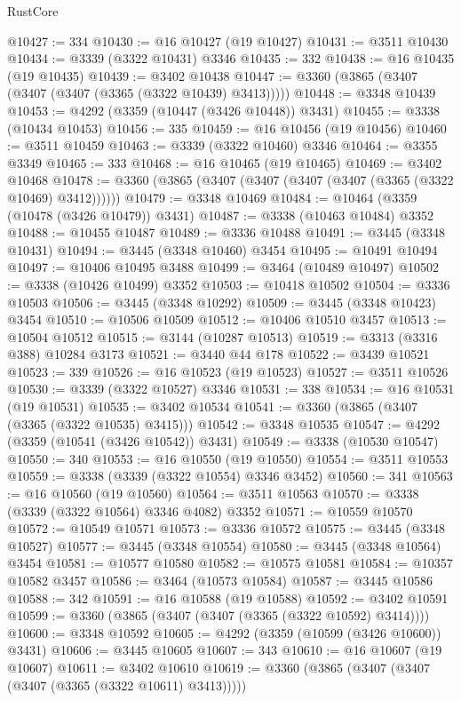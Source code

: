 \begin{lexlean}{RustCore}
\begin{coremodule}
@10427 := 334
@10430 := @16 @10427 (@19 @10427)
@10431 := @3511 @10430
@10434 := @3339 (@3322 @10431) @3346
@10435 := 332
@10438 := @16 @10435 (@19 @10435)
@10439 := @3402 @10438
@10447 := @3360 (@3865 (@3407 (@3407 (@3407 (@3365 (@3322 @10439) @3413)))))
@10448 := @3348 @10439
@10453 := @4292 (@3359 (@10447 (@3426 @10448)) @3431)
@10455 := @3338 (@10434 @10453)
@10456 := 335
@10459 := @16 @10456 (@19 @10456)
@10460 := @3511 @10459
@10463 := @3339 (@3322 @10460) @3346
@10464 := @3355 @3349
@10465 := 333
@10468 := @16 @10465 (@19 @10465)
@10469 := @3402 @10468
@10478 := @3360 (@3865 (@3407 (@3407 (@3407 (@3407 (@3365 (@3322 @10469) @3412))))))
@10479 := @3348 @10469
@10484 := @10464 (@3359 (@10478 (@3426 @10479)) @3431)
@10487 := @3338 (@10463 @10484) @3352
@10488 := @10455 @10487
@10489 := @3336 @10488
@10491 := @3445 (@3348 @10431)
@10494 := @3445 (@3348 @10460) @3454
@10495 := @10491 @10494
@10497 := @10406 @10495 @3488
@10499 := @3464 (@10489 @10497)
@10502 := @3338 (@10426 @10499) @3352
@10503 := @10418 @10502
@10504 := @3336 @10503
@10506 := @3445 (@3348 @10292)
@10509 := @3445 (@3348 @10423) @3454
@10510 := @10506 @10509
@10512 := @10406 @10510 @3457
@10513 := @10504 @10512
@10515 := @3144 (@10287 @10513)
@10519 := @3313 (@3316 @388) @10284 @3173
@10521 := @3440 @44 @178
@10522 := @3439 @10521
@10523 := 339
@10526 := @16 @10523 (@19 @10523)
@10527 := @3511 @10526
@10530 := @3339 (@3322 @10527) @3346
@10531 := 338
@10534 := @16 @10531 (@19 @10531)
@10535 := @3402 @10534
@10541 := @3360 (@3865 (@3407 (@3365 (@3322 @10535) @3415)))
@10542 := @3348 @10535
@10547 := @4292 (@3359 (@10541 (@3426 @10542)) @3431)
@10549 := @3338 (@10530 @10547)
@10550 := 340
@10553 := @16 @10550 (@19 @10550)
@10554 := @3511 @10553
@10559 := @3338 (@3339 (@3322 @10554) @3346 @3452)
@10560 := 341
@10563 := @16 @10560 (@19 @10560)
@10564 := @3511 @10563
@10570 := @3338 (@3339 (@3322 @10564) @3346 @4082) @3352
@10571 := @10559 @10570
@10572 := @10549 @10571
@10573 := @3336 @10572
@10575 := @3445 (@3348 @10527)
@10577 := @3445 (@3348 @10554)
@10580 := @3445 (@3348 @10564) @3454
@10581 := @10577 @10580
@10582 := @10575 @10581
@10584 := @10357 @10582 @3457
@10586 := @3464 (@10573 @10584)
@10587 := @3445 @10586
@10588 := 342
@10591 := @16 @10588 (@19 @10588)
@10592 := @3402 @10591
@10599 := @3360 (@3865 (@3407 (@3407 (@3365 (@3322 @10592) @3414))))
@10600 := @3348 @10592
@10605 := @4292 (@3359 (@10599 (@3426 @10600)) @3431)
@10606 := @3445 @10605
@10607 := 343
@10610 := @16 @10607 (@19 @10607)
@10611 := @3402 @10610
@10619 := @3360 (@3865 (@3407 (@3407 (@3407 (@3365 (@3322 @10611) @3413)))))

\end{coremodule}
\end{lexlean}
